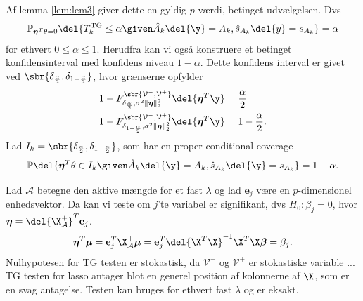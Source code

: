 Af lemma \ref{lem:lem3} giver dette en gyldig \(p\)-værdi, betinget udvælgelsen.
Dvs
\begin{align*}
\mathbb{P}_{\boldsymbol{\eta}^T \theta = 0} \del{T_k^\text{TG} \leq \alpha \given \hat{A}_k \del{\y} = A_k, \hat{s}_{A_k} \del{y} = s_{A_k}} = \alpha
\end{align*}
for ethvert \(0 \leq \alpha \leq 1\).
Herudfra kan vi også konstruere et betinget konfidensinterval med konfidens niveau \(1-\alpha\).
Dette konfidens interval er givet ved \(\sbr{\delta_{\frac{\alpha}{2}}, \delta_{1-\frac{\alpha}{2}}}\), hvor grænserne opfylder
\begin{align*}
1-F_{\delta_{\frac{\alpha}{2}}, \sigma^2 \Vert \boldsymbol{\eta} \Vert_2^2}^{\sbr{\mathcal{V}^-, \mathcal{V}^+}} \del{\boldsymbol{\eta}^T \y} &= \frac{\alpha}{2} \\
1-F_{\delta_{1-\frac{\alpha}{2}}, \sigma^2  \Vert \boldsymbol{\eta} \Vert_2^2}^{\sbr{\mathcal{V}^-, \mathcal{V}^+}} \del{\boldsymbol{\eta}^T \y} &= 1-\frac{\alpha}{2}.
\end{align*}
Lad \(I_k = \sbr{\delta_\frac{\alpha}{2},\delta_{1-\frac{\alpha}{2}}}\), som har en proper conditional coverage
\begin{align*}
\mathbb{P} \del{\boldsymbol{\eta}^T \theta \in I_k \given \hat{A}_k \del{\y} = A_k, \hat{s}_{A_k} \del{\y} = s_{A_k}} = 1-\alpha.
\end{align*}


Lad \(\mathcal{A}\) betegne den aktive mængde for et fast \(\lambda\) og lad \(\mathbf{e}_j\) være en \(p\)-dimensionel enhedsvektor.
Da kan vi teste om \(j\)'te variabel er signifikant, dvs \(H_0: \beta_j =0\), hvor \(\boldsymbol{\eta}=\del{\X_\mathcal{A}^+}^T \mathbf{e}_j\).
\begin{align*}
\boldsymbol{\eta}^T \boldsymbol{\mu} = \mathbf{e}_j^T \X_\mathcal{A}^+ \boldsymbol{\mu} = \mathbf{e}_j^T \del{\X^T \X}^{-1} \X^T \X \boldsymbol{\beta} = \beta_j.
\end{align*}
Nulhypotesen for TG testen er stokastisk, da \(\mathcal{V}^-\) og \(\mathcal{V}^+\) er stokastiske variable ...
TG testen for lasso antager blot en generel position af kolonnerne af \(\X\), som er en svag antagelse.
Testen kan bruges for ethvert fast \(\lambda\) og er eksakt.
%
